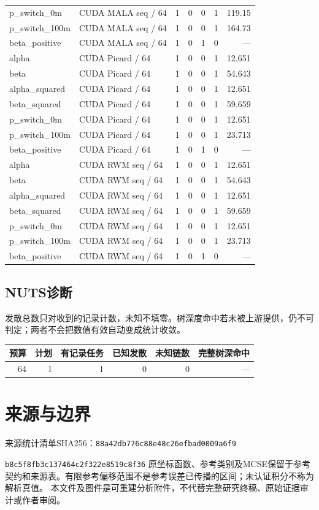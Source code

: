 \documentclass[UTF8,fontset=fandol,a4paper]{ctexart}
\begin{document}
\begin{longtable}{P{28mm}P{40mm}rrrrr}
p\_\allowbreak{}switch\_\allowbreak{}0m & CUDA MALA seq / 64 & 1 & 0 & 0 & 1 & 119.15 \\
p\_\allowbreak{}switch\_\allowbreak{}100m & CUDA MALA seq / 64 & 1 & 0 & 0 & 1 & 164.73 \\
beta\_\allowbreak{}positive & CUDA MALA seq / 64 & 1 & 0 & 1 & 0 & — \\
alpha & CUDA Picard / 64 & 1 & 0 & 0 & 1 & 12.651 \\
beta & CUDA Picard / 64 & 1 & 0 & 0 & 1 & 54.643 \\
alpha\_\allowbreak{}squared & CUDA Picard / 64 & 1 & 0 & 0 & 1 & 12.651 \\
beta\_\allowbreak{}squared & CUDA Picard / 64 & 1 & 0 & 0 & 1 & 59.659 \\
p\_\allowbreak{}switch\_\allowbreak{}0m & CUDA Picard / 64 & 1 & 0 & 0 & 1 & 12.651 \\
p\_\allowbreak{}switch\_\allowbreak{}100m & CUDA Picard / 64 & 1 & 0 & 0 & 1 & 23.713 \\
beta\_\allowbreak{}positive & CUDA Picard / 64 & 1 & 0 & 1 & 0 & — \\
alpha & CUDA RWM seq / 64 & 1 & 0 & 0 & 1 & 12.651 \\
beta & CUDA RWM seq / 64 & 1 & 0 & 0 & 1 & 54.643 \\
alpha\_\allowbreak{}squared & CUDA RWM seq / 64 & 1 & 0 & 0 & 1 & 12.651 \\
beta\_\allowbreak{}squared & CUDA RWM seq / 64 & 1 & 0 & 0 & 1 & 59.659 \\
p\_\allowbreak{}switch\_\allowbreak{}0m & CUDA RWM seq / 64 & 1 & 0 & 0 & 1 & 12.651 \\
p\_\allowbreak{}switch\_\allowbreak{}100m & CUDA RWM seq / 64 & 1 & 0 & 0 & 1 & 23.713 \\
beta\_\allowbreak{}positive & CUDA RWM seq / 64 & 1 & 0 & 1 & 0 & — \\
\bottomrule\end{longtable}\endgroup
\subsection*{NUTS诊断}
发散总数只对收到的记录计数，未知不填零。树深度命中若未被上游提供，仍不可判定；两者不会把数值有效自动变成统计收敛。
\begin{longtable}{rrrrrr}
\toprule 预算 & 计划 & 有记录任务 & 已知发散 & 未知链数 & 完整树深命中 \\ \midrule\endhead
64 & 1 & 1 & 0 & 0 & — \\
\bottomrule\end{longtable}
\clearpage\section*{来源与边界}
来源统计清单SHA256：\texttt{88a42db776c88e48c26efbad0009a6f9}\par\texttt{b8c5f8fb3c137464c2f322e8519c8f36}
原坐标函数、参考类别及MCSE保留于参考契约和来源表。有限参考偏移范围不是参考误差已传播的区间；未认证积分不称为解析真值。
本文件及图件是可重建分析附件，不代替完整研究终稿、原始证据审计或作者审阅。
\end{document}
